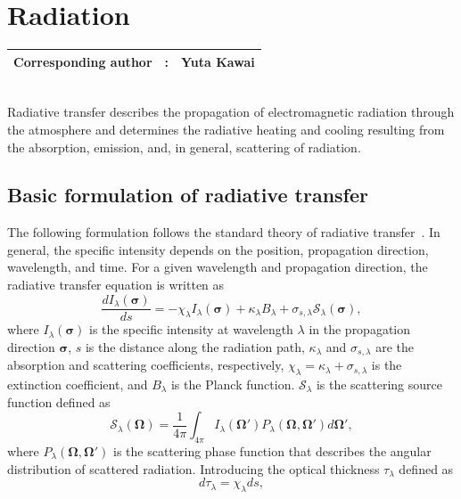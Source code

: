 \section{Radiation}\label{sec:radiation}

{\bf \Large
\begin{tabular}{ccc}
\hline
  Corresponding author & : & Yuta Kawai\\
\hline
\end{tabular}
}
\\

Radiative transfer describes the propagation of electromagnetic radiation through the atmosphere and determines the radiative heating and cooling resulting from the absorption, emission, and, in general, scattering of radiation.

\subsection{Basic formulation of radiative transfer}
The following formulation follows the standard theory of radiative transfer~\citep[e.g.,][]{Liou2002}.
In general, the specific intensity depends on the position, propagation direction, wavelength, and time.
For a given wavelength and propagation direction, the radiative transfer equation is written as
\begin{equation}
  \frac{dI_\lambda(\bm{\sigma})}{ds} =
  -\chi_\lambda I_\lambda(\bm{\sigma})
  +\kappa_\lambda B_\lambda
  +\sigma_{s,\lambda}\mathcal{S}_\lambda(\bm{\sigma}),
\label{eq:radiation_transfer_equation_general_form}
\end{equation}
where $I_\lambda(\bm{\sigma})$ is the specific intensity at wavelength $\lambda$ in the propagation direction $\bm{\sigma}$,
$s$ is the distance along the radiation path,
$\kappa_\lambda$ and $\sigma_{s,\lambda}$ are the absorption and scattering coefficients, respectively,
$\chi_\lambda=\kappa_\lambda+\sigma_{s,\lambda}$ is the extinction coefficient,
and $B_\lambda$ is the Planck function. $\mathcal{S}_\lambda$ is the scattering source function defined as
\begin{equation}
  \mathcal{S}_\lambda(\bm{\Omega}) = \frac{1}{4\pi}\int_{4\pi} I_\lambda(\bm{\Omega}') P_\lambda(\bm{\Omega},\bm{\Omega}') d\bm{\Omega}',
\end{equation}
where $P_\lambda(\bm{\Omega},\bm{\Omega}')$ is the scattering phase function that describes the angular distribution of scattered radiation.
Introducing the optical thickness $\tau_\lambda$ defined as
\begin{equation}
  d\tau_\lambda = \chi_\lambda ds,
\end{equation}
